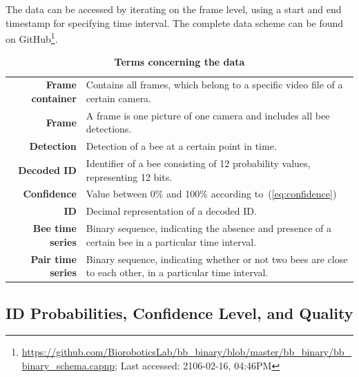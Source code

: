The data can be accessed by iterating on the frame level, using a start and end time\-stamp for specifying time interval. The complete data scheme can be found on GitHub\footnote{\url{https://github.com/BioroboticsLab/bb_binary/blob/master/bb_binary/bb_binary_schema.capnp}; Last accessed: 2106-02-16, 04:46PM}.


\begin{table}[!t]
\small
\caption[Terms concerning the data]{\textbf{Terms concerning the data}}
\label{tab:dataset}
\vspace{3mm}
\colorbox{usethiscolorhere}{
\centering
\begin{tabularx}{\textwidth}{@{} r Y @{}}
	\textbf{Frame container} &
	Contains all frames, which belong to a specific video file of a certain camera.\vspace{2mm}\\
	\textbf{Frame} &
	A frame is one picture of one camera and includes all bee detections.\vspace{2mm}\\
	\textbf{Detection} &
	Detection of a bee at a certain point in time.\vspace{2mm}\\
	\textbf{Decoded ID} &
	Identifier of a bee consisting of 12 probability values, representing 12 bits.\vspace{2mm}\\
	\textbf{Confidence} &
	Value between 0\% and 100\% according to~(\ref{eq:confidence})\vspace{2mm}\\
	\textbf{ID} &
	Decimal representation of a decoded ID.\vspace{2mm}\\
	\textbf{Bee time series} & Binary sequence, indicating the absence and presence of a certain bee in a particular time interval.\vspace{2mm}\\
	\textbf{Pair time series} & Binary sequence, indicating whether or not two bees are close to each other, in a particular time interval.\\
\end{tabularx}
}
\end{table}
\subsection{ID Probabilities, Confidence Level, and Quality}
\label{subsec:confidence}

